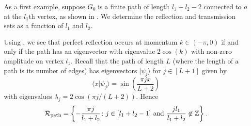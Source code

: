 \documentclass[../thesis-main/thesis-main]{subfiles}
\begin{document}
As a first example, suppose $G_0$ is a finite path of length $l_1+l_2-2$ connected to $a$ at the $l_1$th vertex, as shown in .  We determine the reflection and transmission sets as a function of $l_1$ and $l_2$.

%    
%    
%    
%    
%    
%    
%
%    
%    
%    
%        
%    
%    
%

Using , we see that perfect reflection occurs at momentum $k\in (-\pi,0)$ if and only if the path has an eigenvector with eigenvalue $2\cos(k)$ with non-zero amplitude on vertex $l_1$.  Recall that the path of length $L$ (where the length of a path is its number of edges) has eigenvectors $|\psi_j\rangle$ for $j\in [L+1]$ given by
\begin{equation}
  \langle x | \psi_j \rangle = \sin\left(\frac{ \pi j x}{L+2}\right)\label{eq:vecs_line}
\end{equation}
with eigenvalues $\lambda_j = 2 \cos(\pi j/(L+2))$.  Hence
\[
  \mathcal{R}_{\mathrm{path}} = \left\{ -\frac{\pi j}{l_1 + l_2} \colon j\in [l_1 + l_2 - 1] \text{ and } \frac{jl_1}{l_1+l_2} \not\in \mathbb{Z}\right\}.
\]
\end{document}
